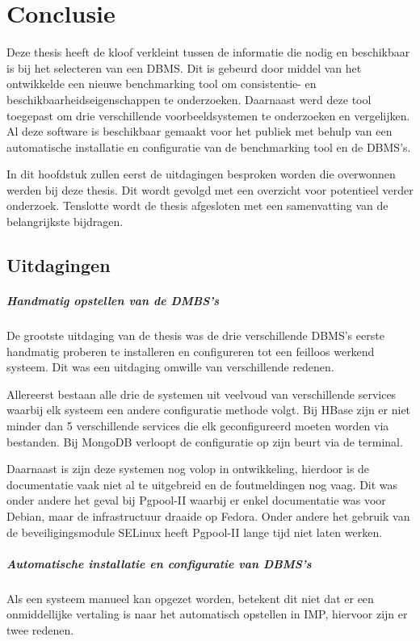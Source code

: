 \chapter{Conclusie}\label{sec:conclusie}
Deze thesis heeft de kloof verkleint tussen de informatie die nodig en beschikbaar is bij het selecteren van een DBMS. Dit is gebeurd door middel van het ontwikkelde een nieuwe benchmarking tool om consistentie- en beschikbaarheidseigenschappen te onderzoeken. Daarnaast werd deze tool toegepast om drie verschillende voorbeeldsystemen te onderzoeken en vergelijken. Al deze software is beschikbaar gemaakt voor het publiek met behulp van een automatische installatie en configuratie van de benchmarking tool en de DBMS's. 

In dit hoofdstuk zullen eerst de uitdagingen besproken worden die overwonnen werden bij deze thesis. Dit wordt gevolgd met een overzicht voor potentieel verder onderzoek. Tenslotte wordt de thesis afgesloten met een samenvatting van de belangrijkste bijdragen. 

\section{Uitdagingen}
\paragraph{Handmatig opstellen van de DMBS's} De grootste uitdaging van de thesis was de drie verschillende DBMS's eerste handmatig proberen te installeren en configureren tot een feilloos werkend systeem. Dit was een uitdaging omwille van verschillende redenen. 

Allereerst bestaan alle drie de systemen uit veelvoud van verschillende services waarbij elk systeem een andere configuratie methode volgt. Bij HBase zijn er niet minder dan 5 verschillende services die elk geconfigureerd moeten worden via bestanden. Bij MongoDB verloopt de configuratie op zijn beurt via de terminal. 

Daarnaast is zijn deze systemen nog volop in ontwikkeling, hierdoor is de documentatie vaak niet al te uitgebreid en de foutmeldingen nog vaag. Dit was onder andere het geval bij Pgpool-II waarbij er enkel documentatie was voor Debian, maar de infrastructuur draaide op Fedora. Onder andere het gebruik van de beveiligingsmodule SELinux heeft Pgpool-II lange tijd niet laten werken. 

\paragraph{Automatische installatie en configuratie van DBMS's} Als een systeem manueel kan opgezet worden, betekent dit niet dat er een onmiddellijke vertaling is naar het automatisch opstellen in IMP, hiervoor zijn er twee redenen. 

